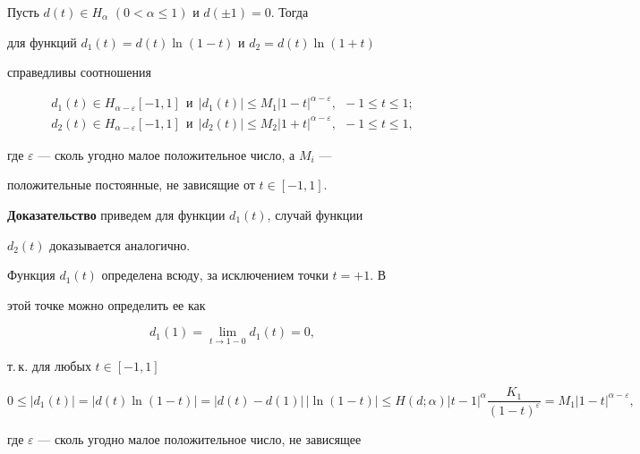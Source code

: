 \begin{lem} 


Пусть $d(t)\in H_\alpha$ $(0<\alpha\le1)$ и $d(\pm1)=0$. Тогда 


для функций $d_1(t)=d(t)\ln(1-t)$ и $d_2=d(t)\ln(1+t)$ 


справедливы соотношения 


\begin{gather*} 


d_1(t)\in H_{\alpha-\varepsilon}[-1,1]\ \ \text{и}\ \ 


|d_1(t)|\le M_1|1-t|^{\alpha-\varepsilon},\ \ -1\le t\le1;\\ 


% 


d_2(t)\in H_{\alpha-\varepsilon}[-1,1]\ \ \text{и}\ \ 


|d_2(t)|\le M_2|1+t|^{\alpha-\varepsilon},\ \ -1\le t\le1, 


\end{gather*} 


где $\varepsilon$ --- сколь угодно малое положительное число, а $M_i$ --- 


положительные постоянные, не зависящие от $t\in[-1,1]$. 


\end{lem} 


 


{\bf Доказательство} приведем для функции $d_1(t)$, случай функции 


$d_2(t)$ доказывается аналогично. 


 


Функция $d_1(t)$ определена всюду, за исключением точки $t=+1$. В 


этой точке можно определить ее как 


$$ 


d_1(1)=\lim_{t\to1-0}d_1(t)=0, 


$$ 


т.\,к. для любых $t\in[-1,1]$ 


$$ 


0\le|d_1(t)|=|d(t)\ln(1-t)|=|d(t)-d(1)|\,|\ln(1-t)|\le 


H(d;\alpha)|t-1|^\alpha\frac{K_1}{(1-t)^\varepsilon}= 


M_1|1-t|^{\alpha-\varepsilon}, 


$$ 


где $\varepsilon$ --- сколь угодно малое положительное число, не зависящее 


